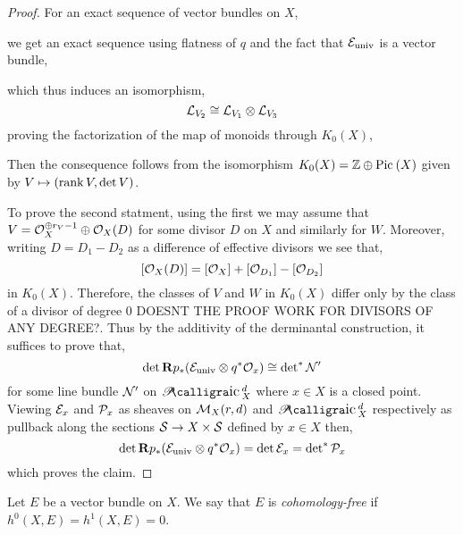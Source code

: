 \documentclass[12pt]{article}
\begin{document}
\begin{proof}
For an exact sequence of vector bundles on $X$,
\begin{center}
\end{center}
we get an exact sequence using flatness of $q$ and the fact that $\E_{\univ}$ is a vector bundle,
\begin{center}
\end{center}
which thus induces an isomorphism,
\[ \L_{V_2} \cong \L_{V_1} \ot \L_{V_3} \]
proving the factorization of the map of monoids through $K_0(X)$,
\begin{center}
\end{center}
Then the consequence follows from the isomorphism $K_0(X) = \Z \oplus \Pic{X}$ given by $V \mapsto (\rank{V}, \det{V})$. 
\par
To prove the second statment, using the first we may assume that $V = \struct{X}^{\oplus r_V - 1} \oplus \struct{X}(D)$ for some divisor $D$ on $X$ and similarly for $W$. Moreover, writing $D = D_1 - D_2$ as a difference of effective divisors we see that,
\[ [\struct{X}(D)] = [\struct{X}] + [\struct{D_1}] - [\struct{D_2}] \]
in $K_0(X)$. Therefore, the classes of $V$ and $W$ in $K_0(X)$ differ only by the class of a divisor of degree $0$ {\color{red} DOESNT THE PROOF WORK FOR DIVISORS OF ANY DEGREE?}. Thus by the additivity of the derminantal construction, it suffices to prove that,
\[ \det{\R p_* (\E_{\univ} \ot q^* \struct{x})} \cong \detstar \cN' \]
for some line bundle $\cN'$ on $\cPic^d_X$ where $x \in X$ is a closed point. Viewing $\E_x$ and $\cP_x$ as sheaves on $\M_X(r,d)$ and $\cPic^d_X$ respectively as pullback along the sections $\S \to X \times \S$ defined by $x \in X$ then,
\[ \det{\R p_* (\E_{\univ} \ot q^* \struct{x})} = \det{\E_x} = \detstar \cP_x \]
which proves the claim. 
\end{proof}

\begin{defn}
Let $E$ be a vector bundle on $X$. We say that $E$ is \textit{cohomology-free} if $h^0(X, E) = h^1(X, E) = 0$.
\end{defn}
\end{document}

